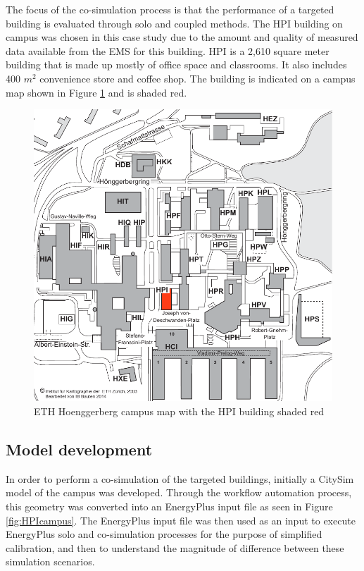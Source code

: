 \documentclass{tBPS2e}
\theoremstyle{plain}
\theoremstyle{definition}
\theoremstyle{remark}
\begin{document}


The focus of the co-simulation process is that the performance of a targeted
building is evaluated through solo and coupled methods. The HPI building on
campus was chosen in this case study due to the amount and quality of measured
data available from the EMS for this building. HPI is a 2,610 square meter
building that is made up mostly of office space and classrooms. It also
includes 400 $m^2$ convenience store and coffee shop. The building is
indicated on a campus map shown in Figure \ref{fig:campusmap} and is shaded
red.

\begin{figure}[H]
\centering
\includegraphics[scale=0.5]{figures/ETH_Hoenngerbergcamp_targetedbuildings_HPI}
\caption{ETH Hoenggerberg campus map with the HPI building shaded red}
\label{fig:campusmap}
\end{figure}

\subsection{Model development}
In order to perform a co-simulation of the targeted buildings, initially a
CitySim model of the campus was developed. Through the workflow automation
process, this geometry was converted into an EnergyPlus input file as seen in
Figure \ref{fig:HPIcampus}. The EnergyPlus input file was then used as an input
to execute EnergyPlus solo and co-simulation processes for the purpose of
simplified calibration, and then to understand the magnitude of difference
between these simulation scenarios.
\end{document}
